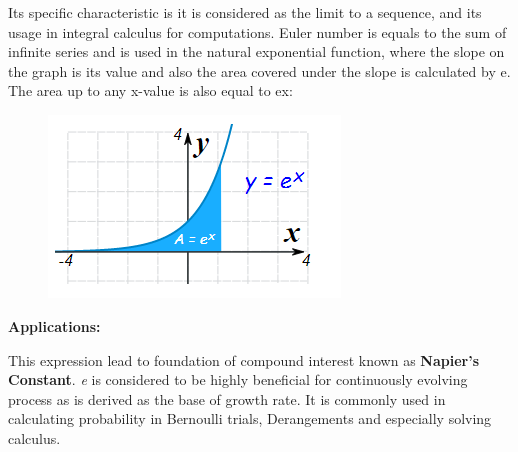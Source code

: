 \documentclass[12pt]{report}
\begin{document}
\begin{justify}
Its specific characteristic is it is considered as the limit to a sequence, and its usage in integral calculus for computations. Euler number is equals to the sum of infinite series and is used in the natural exponential function, where the slope on the graph is its value and also the area covered under the slope is calculated by e. The area up to any x-value is also equal to ex:
\end{justify}\par


\vspace{\baselineskip}



\begin{figure}[H]
	\begin{Center}
		\includegraphics[width=3.05in,height=1.91in]{./image2.png}
	\end{Center}
\end{figure}



\par

\begin{justify}
{\fontsize{14pt}{16.8pt}\selectfont \textbf{\textcolor[HTML]{2F5496}{Applications:}}\par}
\end{justify}\par

\begin{justify}
This expression lead to foundation of compound interest known as \textbf{Napier's Constant}. \textit{e} is considered to be highly beneficial for continuously evolving process as is derived as the base of growth rate. It is commonly used in calculating probability in Bernoulli trials, Derangements and especially solving calculus.
\end{justify}\par
\end{document}
